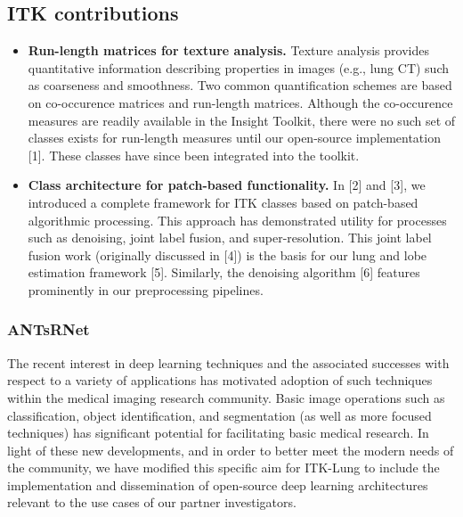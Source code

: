 \documentclass[11pt,]{article}
\title{}
\author{}
\date{}
\begin{document}
\hypertarget{itk-contributions}{%
\subsection{ITK contributions}\label{itk-contributions}}

\begin{itemize}
\item
  \textbf{Run-length matrices for texture analysis.} Texture analysis
  provides quantitative information describing properties in images
  (e.g., lung CT) such as coarseness and smoothness. Two common
  quantification schemes are based on co-occurence matrices and
  run-length matrices. Although the co-occurence measures are readily
  available in the Insight Toolkit, there were no such set of classes
  exists for run-length measures until our open-source implementation
  {[}1{]}. These classes have since been integrated into the toolkit.
\item
  \textbf{Class architecture for patch-based functionality.} In {[}2{]}
  and {[}3{]}, we introduced a complete framework for ITK classes based
  on patch-based algorithmic processing. This approach has demonstrated
  utility for processes such as denoising, joint label fusion, and
  super-resolution. This joint label fusion work (originally discussed
  in {[}4{]}) is the basis for our lung and lobe estimation framework
  {[}5{]}. Similarly, the denoising algorithm {[}6{]} features
  prominently in our preprocessing pipelines.
\end{itemize}

\hypertarget{antsrnet}{%
\subsubsection{ANTsRNet}\label{antsrnet}}

The recent interest in deep learning techniques and the associated
successes with respect to a variety of applications has motivated
adoption of such techniques within the medical imaging research
community. Basic image operations such as classification, object
identification, and segmentation (as well as more focused techniques)
has significant potential for facilitating basic medical research. In
light of these new developments, and in order to better meet the modern
needs of the community, we have modified this specific aim for ITK-Lung
to include the implementation and dissemination of open-source deep
learning architectures relevant to the use cases of our partner
investigators.
\end{document}
